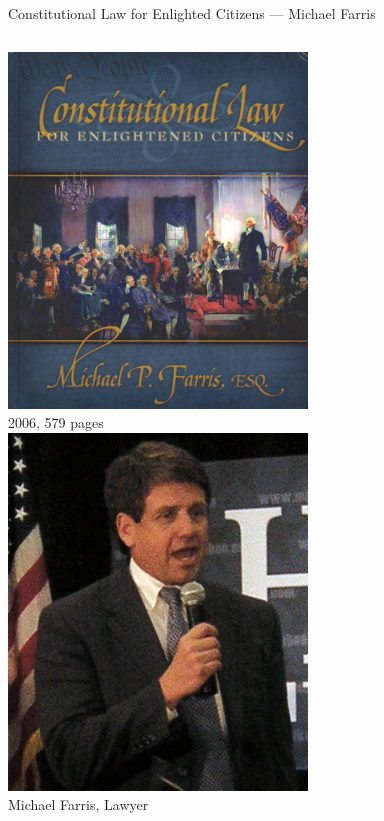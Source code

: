 \begin{frame}{Constitutional Law for Enlighted Citizens --- Michael Farris}
    \begin{columns}[onlytextwidth]
            \centering
            \includegraphics[width=0.75\textwidth]{img/constitutional-law.png} \\
            2006, 579 pages \\

            \centering
            \includegraphics[width=0.75\textwidth]{img/michael-farris.png} \\
            Michael Farris, Lawyer
    \end{columns}
\end{frame}

